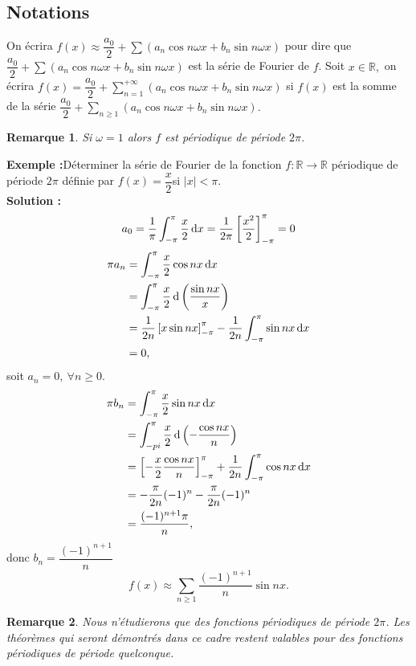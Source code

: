 \documentclass[11pt, a4paper]{book}
\newtheorem{rem}{Remarque}[section]
\begin{document}
\subsection{Notations}
On \'ecrira $f(x)\approx \dfrac{a_0}{2}+\sum\left(a_n\cos n\omega x+b_n\sin n\omega x\right)$ pour dire que $\dfrac{a_0}{2}+\sum\left(a_n\cos n\omega x+b_n\sin n\omega x\right)$ est la s\'erie de Fourier de $f$. Soit $x\in \mathbb{R},$ on \'ecrira ${\displaystyle f(x)=\dfrac{a_0}{2}+\sum_{n=1}^{+\infty}\left(a_n\cos n\omega x+b_n\sin n\omega x\right)}$ si $f(x)$ est la somme de la s\'erie ${\displaystyle \dfrac{a_0}{2}+\sum_{n\geq 1}\left(a_n\cos n\omega x+b_n\sin n\omega x\right)}.$
\begin{rem} Si $\omega=1$ alors $f$ est p\'eriodique de p\'eriode $2\pi$.
\end{rem}
\textbf{Exemple :}\quad D\'eterminer la s\'erie de Fourier de la fonction $f:\mathbb{R}\rightarrow\mathbb{R}$ p\'eriodique de p\'eriode $2\pi$ d\'efinie par $f(x)=\dfrac{x}{2}$\quad si $|x|<\pi$.\\
\textbf{Solution :} $$a_0=\dfrac{1}{\pi}\int_{-\pi}^{\pi}\dfrac{x}{2}\,\mathrm{d} x=\dfrac{1}{2\pi}\left[\dfrac{x^2}{2}\right]_{-\pi}^{\pi}=0$$
\begin{align*}
\pi a_n&=\int_{-\pi}^\pi \dfrac{x}{2}\cos nx\,\mathrm{d} x\\&=\int_{-\pi}^\pi\dfrac{x}{2} \,\mathrm{d}\left(\dfrac{\sin nx}{x}\right)\\&=\dfrac{1}{2n}\left[x\sin nx\right]_{-\pi}^\pi-\dfrac{1}{2n}\int_{-\pi}^{\pi}\sin nx\,\mathrm{d} x\\&=0,
\end{align*} soit $a_n=0,~\forall n\geq 0$. 
\begin{align*}
\pi b_n&=\int_{-\pi}^\pi \dfrac{x}{2}\sin nx\,\mathrm{d} x\\&=\int_{-pi}^\pi \dfrac{x}{2}\,\mathrm{d}\left(-\dfrac{\cos nx}{n}\right)\\&=\left[-\dfrac{x}{2}\dfrac{\cos nx}{n}\right]_{-\pi}^\pi+\dfrac{1}{2n}\int_{-\pi}^\pi \cos nx\,\mathrm{d} x\\&=-\dfrac{\pi}{2n}(-1)^n-\dfrac{\pi}{2n}(-1)^n\\&=\dfrac{(-1)^{n+1}\pi}{n},
\end{align*}
donc $b_n=\dfrac{(-1)^{n+1}}{n}$  
$$f(x)\approx \sum_{n\geq 1}\dfrac{(-1)^{n+1}}{n}\sin nx.$$
\begin{rem} Nous n'\'etudierons que des fonctions p\'eriodiques de p\'eriode $2\pi$. Les th\'eor\`emes qui seront d\'emontr\'es dans ce cadre restent valables pour des fonctions p\'eriodiques de p\'eriode quelconque.
\end{rem}
\end{document}
